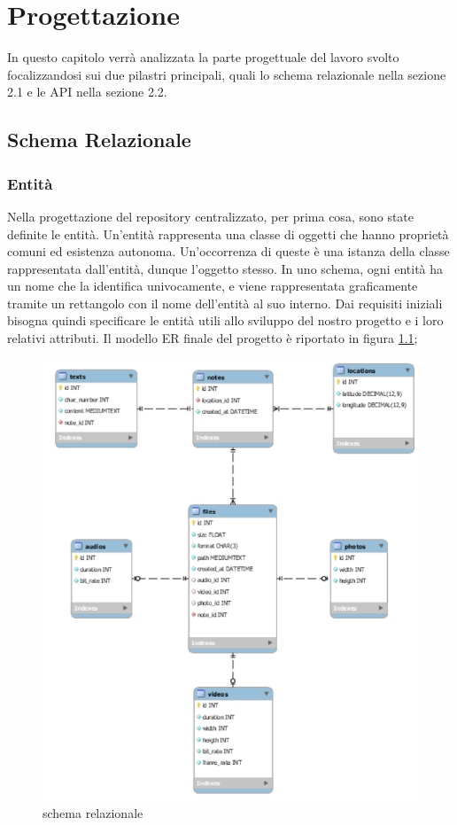 \chapter{Progettazione}

In questo capitolo verrà analizzata la parte progettuale del lavoro svolto focalizzandosi sui due pilastri principali, quali lo schema relazionale nella sezione 2.1 e le API nella sezione 2.2.

\section{Schema Relazionale}
\subsection{Entità}
Nella progettazione del repository centralizzato, per prima cosa, sono state definite le entità. Un'entità rappresenta una classe di oggetti che hanno proprietà comuni ed esistenza autonoma. Un'occorrenza di queste è una istanza della classe rappresentata dall'entità, dunque l'oggetto stesso. In uno schema, ogni entità ha un nome che la identifica univocamente, e viene rappresentata graficamente tramite un rettangolo con il nome dell'entità al suo interno.
Dai requisiti iniziali bisogna quindi specificare le entità utili allo sviluppo del nostro progetto e i loro relativi attributi. Il modello ER finale del progetto è riportato in figura \ref{fig:ERModel};

\begin{figure}[!h]
	\centering
	\includegraphics{schemaER.png}
	\caption{schema relazionale}
	\label{fig:ERModel}
\end{figure}

